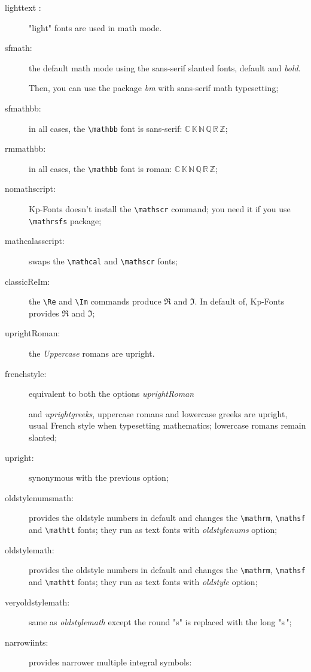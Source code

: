 \documentclass[a4paper,11pt]{christophe}
\begin{document}
\begin{description}

	\item[lighttext :] "light" fonts are used in math mode.
  \item[sfmath:] the default math mode using the sans-serif slanted fonts, default and \textit{bold}.
  
       Then, you can use the package \textit{bm} with sans-serif math typesetting;
  \item[sfmathbb:] in all cases, the \verb=\mathbb= font is sans-serif:
        { $\mathbb{C\,K\,N\,Q\,R\,Z}$};
  \item[rmmathbb:] in all cases, the \verb=\mathbb= font is roman:
        { $\mathbb{C\,K\,N\,Q\,R\,Z}$};
	\item[nomathscript:] Kp-Fonts doesn't install the \verb=\mathscr= command; you need it if you use \verb=\mathrsfs=
				package;
	\item[mathcalasscript:] swaps the \verb=\mathcal= and \verb=\mathscr= fonts;
	\item[classicReIm:] the \verb=\Re= and \verb=\Im= commands produce $\mathfrak{R}$ and $\mathfrak{I}$. In default of, Kp-Fonts provides $\Re$ and $\Im$;
	\item[uprightRoman:] the \textit{Uppercase} romans are upright.
	\item[frenchstyle:] equivalent to both the options \textit{uprightRoman} 
	
	and \textit{uprightgreeks}, uppercase romans and lowercase greeks are upright, usual French style when typesetting mathematics; lowercase romans remain slanted;
	\item[upright:] synonymous with the previous option;
	\item[oldstylenumsmath:] provides the oldstyle numbers in default and changes the \verb=\mathrm=,
				\verb=\mathsf= and \verb=\mathtt= fonts; they run as text fonts with \textit{oldstylenums} option;
	\item[oldstylemath:] provides the oldstyle numbers in default and changes the \verb=\mathrm=,
				\verb=\mathsf= and \verb=\mathtt= fonts; they run as text fonts with \textit{oldstyle} option;
	\item[veryoldstylemath:] same as \textit{oldstylemath} except the round "s"
		is replaced with the long "{\selectfont s}\,";
	\item[narrowiints:] provides narrower multiple integral symbols:
	

\end{description}
\end{document}
